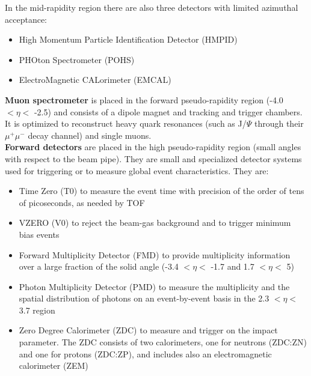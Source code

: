 In the mid-rapidity region there are also three detectors with limited azimuthal acceptance: 
\begin{itemize}
\item High Momentum Particle Identification Detector (HMPID)
\item PHOton Spectrometer (POHS)
\item ElectroMagnetic CALorimeter (EMCAL)
\end{itemize}


\textbf{Muon spectrometer} is placed in the forward pseudo-rapidity region (-4.0 $< \eta <$ -2.5) and consists of a dipole magnet and tracking and trigger chambers. It is optimized to reconstruct heavy quark resonances (such as J/$\Psi$ through their $\mu^{+}\mu^{-}$ decay channel) and single muons. \\

\textbf{Forward detectors} are placed in the high pseudo-rapidity region (small angles with respect to the beam pipe). They are small and specialized detector systems used for triggering or to measure global event characteristics. They are:

\begin{itemize}
\item Time Zero (T0) to measure the event time with precision of the order of tens of picoseconds, as needed by TOF
\item VZERO (V0) to reject the beam-gas background and to trigger minimum bias events
\item Forward Multiplicity Detector (FMD) to provide multiplicity information over a large fraction of the solid angle (-3.4 $< \eta <$ -1.7 and 1.7 $< \eta <$ 5)
\item Photon Multiplicity Detector (PMD) to measure the multiplicity and the spatial distribution of photons on an event-by-event basis in the 2.3 $< \eta <$ 3.7 region
\item Zero Degree Calorimeter (ZDC) to measure and trigger on the impact parameter. The ZDC consists of two calorimeters, one for neutrons (ZDC:ZN) and one for protons (ZDC:ZP), and includes also an electromagnetic calorimeter (ZEM)
\end{itemize}


